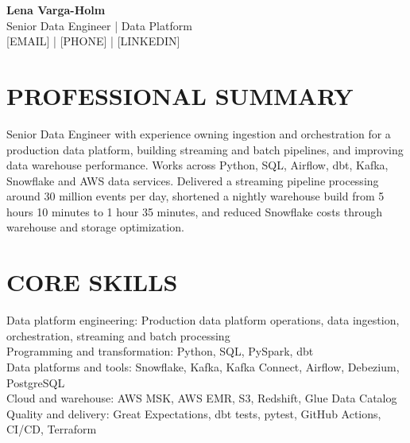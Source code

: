 \documentclass[11pt,a4paper]{article}
\begin{document}
\begin{center}
{\LARGE\bfseries Lena Varga-Holm}\\
{\large Senior Data Engineer | Data Platform}\\[0.25em]
[EMAIL] | [PHONE] | [LINKEDIN]
\end{center}

\section*{PROFESSIONAL SUMMARY}
Senior Data Engineer with experience owning ingestion and orchestration for a production data platform, building streaming and batch pipelines, and improving data warehouse performance. Works across Python, SQL, Airflow, dbt, Kafka, Snowflake and AWS data services. Delivered a streaming pipeline processing around 30 million events per day, shortened a nightly warehouse build from 5 hours 10 minutes to 1 hour 35 minutes, and reduced Snowflake costs through warehouse and storage optimization.

\section*{CORE SKILLS}
Data platform engineering: Production data platform operations, data ingestion, orchestration, streaming and batch processing\\
Programming and transformation: Python, SQL, PySpark, dbt\\
Data platforms and tools: Snowflake, Kafka, Kafka Connect, Airflow, Debezium, PostgreSQL\\
Cloud and warehouse: AWS MSK, AWS EMR, S3, Redshift, Glue Data Catalog\\
Quality and delivery: Great Expectations, dbt tests, pytest, GitHub Actions, CI/CD, Terraform
\end{document}
